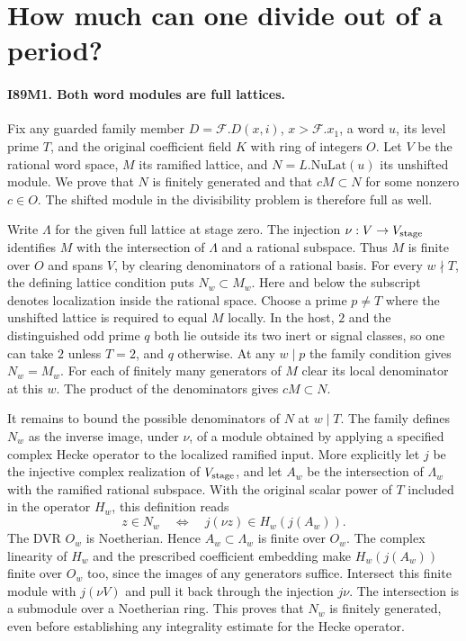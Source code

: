 \section{How much can one divide out of a period?}

\paragraph{I89M1. Both word modules are full lattices.}
Fix any guarded family member $D=\mathcal F.D(x,i)$, $x>\mathcal F.x_1$,
a word $u$, its level prime $T$, and the original coefficient field
$K$ with ring of integers $O$. Let $V$ be the rational word space,
$M$ its ramified lattice, and $N=L.\mathrm{NuLat}(u)$ its unshifted
module. We prove that $N$ is finitely generated and that
$cM\subset N$ for some nonzero $c\in O$.
The shifted module in the divisibility problem is therefore full as well.

Write $\Lambda$ for the given full lattice at stage zero. The injection
$\nu:V\to V_{\rm stage}$ identifies $M$ with the intersection of
$\Lambda$ and a rational subspace. Thus $M$ is finite over $O$ and
spans $V$, by clearing denominators of a rational basis. For every
$w\nmid T$, the defining lattice condition puts $N_w\subset M_w$.
Here and below the subscript denotes localization inside the rational
space. Choose a prime $p\ne T$ where the unshifted lattice is required
to equal $M$ locally. In the host, $2$ and the distinguished odd prime
$q$ both lie outside its two inert or signal classes, so one can take
$2$ unless $T=2$, and $q$ otherwise. At any $w\mid p$ the family
condition gives $N_w=M_w$. For each of finitely many generators of
$M$ clear its local denominator at this $w$. The product of the
denominators gives $cM\subset N$.

It remains to bound the possible denominators of $N$ at $w\mid T$.
The family defines $N_w$ as the inverse image, under $\nu$, of a
module obtained by applying a specified complex Hecke operator to
the localized ramified input. More explicitly let $j$ be the
injective complex realization of $V_{\rm stage}$, and let $A_w$
be the intersection of $\Lambda_w$ with the ramified rational
subspace. With the original scalar power of $T$ included in the
operator $H_w$, this definition reads
\[
       z\in N_w\quad\Longleftrightarrow\quad
       j(\nu z)\in H_w(j(A_w)).
\]
The DVR $O_w$ is Noetherian. Hence $A_w\subset\Lambda_w$ is finite
over $O_w$. The complex linearity of $H_w$ and the prescribed
coefficient embedding make $H_w(j(A_w))$ finite over $O_w$ too, since the images of any generators suffice. Intersect this finite module
with $j(\nu V)$ and pull it back through the injection $j\nu$.
The intersection is a submodule over a Noetherian ring. This proves
that $N_w$ is finitely generated, even before establishing any
integrality estimate for the Hecke operator.

